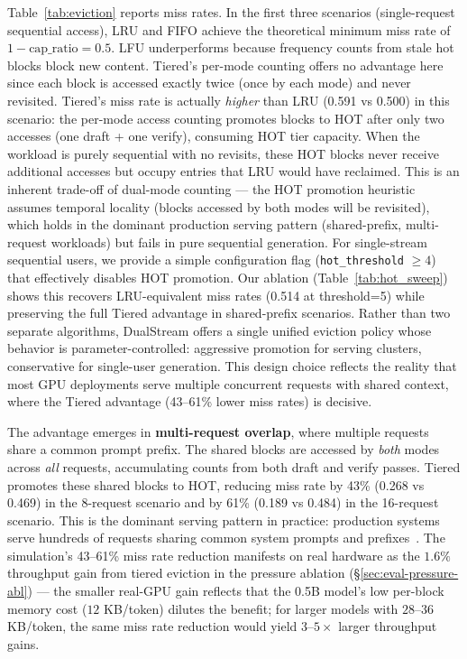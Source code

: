 \documentclass[review]{elsarticle}
\theoremstyle{definition}
\theoremstyle{remark}
\begin{document}
Table~\ref{tab:eviction} reports miss rates. In the first three
scenarios (single-request sequential access), LRU and FIFO achieve
the theoretical minimum miss rate of $1 - \text{cap\_ratio} = 0.5$.
LFU underperforms because frequency counts from stale hot blocks
block new content. Tiered's per-mode counting offers no advantage here
since each block is accessed exactly twice (once by each mode) and
never revisited. Tiered's miss rate is actually \emph{higher} than LRU
(0.591 vs 0.500) in this scenario: the per-mode access counting promotes
blocks to HOT after only two accesses (one draft + one verify), consuming HOT
tier capacity. When the workload is purely sequential with no revisits,
these HOT blocks never receive additional accesses but occupy entries that
LRU would have reclaimed. This is an inherent trade-off of dual-mode counting
--- the HOT promotion heuristic assumes temporal locality (blocks accessed
by both modes will be revisited), which holds in the dominant production
serving pattern (shared-prefix, multi-request workloads) but fails in pure
sequential generation. For single-stream sequential users, we provide a simple
configuration flag (\texttt{hot\_threshold} $\ge 4$) that effectively disables
HOT promotion. Our ablation (Table~\ref{tab:hot_sweep}) shows this recovers
LRU-equivalent miss rates (0.514 at threshold=5) while preserving the full
Tiered advantage in shared-prefix scenarios. Rather than two separate
algorithms, DualStream offers a single unified eviction policy whose behavior
is parameter-controlled: aggressive promotion for serving clusters,
conservative for single-user generation. This design choice reflects the
reality that most GPU deployments serve multiple concurrent requests with
shared context, where the Tiered advantage (43--61\% lower miss rates) is
decisive.

The advantage emerges in \textbf{multi-request overlap}, where multiple
requests share a common prompt prefix. The shared blocks are accessed
by \emph{both} modes across \emph{all} requests, accumulating counts
from both draft and verify passes. Tiered promotes these shared
blocks to HOT, reducing miss rate by 43\% (0.268 vs 0.469) in the
8-request scenario and by 61\% (0.189 vs 0.484) in the 16-request
scenario. This is the dominant serving pattern in practice: production
systems serve hundreds of requests sharing common system prompts and
prefixes~\cite{sharegpt}. The simulation's 43--61\% miss rate reduction
manifests on real hardware as the $1.6\%$ throughput gain from tiered
eviction in the pressure ablation (\S\ref{sec:eval-pressure-abl}) --- the
smaller real-GPU gain reflects that the 0.5B model's low per-block memory
cost ($12$ KB/token) dilutes the benefit; for larger models with $28$--$36$
KB/token, the same miss rate reduction would yield $3$--$5\times$ larger
throughput gains.
\end{document}
